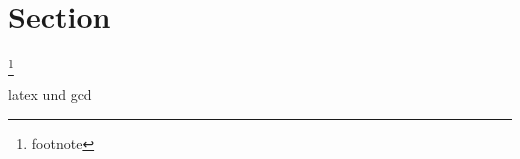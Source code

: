 
\section{Section}


\lipsum[1]\footnote{footnote} \cite{nguyen_machine_2018} 

\lipsum[1]\gls{latex} und \gls{gcd}